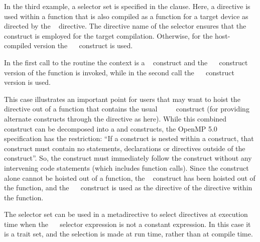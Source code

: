 

In the third example, a  selector set is specified in the  clause.  
Here, a  directive is used within a function that is also
compiled as a function for a target device as directed by the ~ directive.
The  directive name of the  selector ensures that the
~~ construct is employed for the target compilation.
Otherwise, for the host-compiled version the ~~ construct is used.

In the first call to the  routine the context is a
~ construct and the ~~
construct version of the function is invoked,
while in the second call the ~~ construct version is used.

This case illustrates an important point for users that may want to hoist the 
 directive out of a function that contains the usual 
~~~~ construct
(for providing alternate constructs through the  directive as here).
While this combined construct can be decomposed into a  and
 constructs, the OpenMP 5.0 specification has the restriction:
``If a  construct is nested within a  construct, that  construct must
contain no statements, declarations or directives outside of the  construct''.
So, the  construct must immediately follow the  construct without any intervening
code statements (which includes function calls).  
Since the  construct alone cannot be hoisted out of a function, 
the ~ construct has been hoisted out of the function, and the 
~~ construct is used
as the  directive of the  directive within the function.



The  selector set can be used in a metadirective
to select directives at execution time when the 
~~\code{)} selector expression is not a constant expression.
In this case it is a  trait set, and the selection is made at run time, rather
than at compile time.

